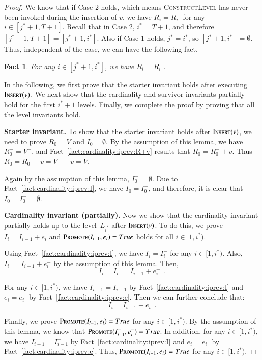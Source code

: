 \documentclass[11pt]{article}
\newtheorem{fact}[theorem]{Fact}
\newcommand{\constLevel}{\textsc{ConstructLevel}}
\newcommand{\replacementTester}{\textsc{Promote}}
\newcommand{\insertv}{{\textsc{Insert}}}
\begin{document}
\begin{proof}
We know that if Case 2 holds, which means \constLevel{} has never been invoked during the insertion of $v$, we have $R_i = R_i^-$  for any $i \in [j^* + 1, T + 1]$. Recall that in Case 2, $i^* = T + 1$, and therefore $[j^*+1, T+1] = [j^*+1, i^*]$. Also if Case 1 holds, $j^* = i^*$, so $[j^* + 1, i^*] = \emptyset$. Thus, independent of the case, we can have the following fact.

\begin{fact}
\label{fact:cardinality:iprev:R}
 For any $i \in [j^*+1, i^*]$, we have $R_i = R_i^-$.
\end{fact}

In the following, we first prove that the starter invariant holds after executing $\insertv(v)$. We next show that the cardinality and survivor invariants partially hold for the first $i^*+1$ levels. Finally, we complete the proof by proving that all the level invariants hold.

\textbf{Starter invariant.}
To show that the starter invariant holds after $\insertv(v)$, we need to prove $R_0= V$ and $I_0=\emptyset$.
By the assumption of this lemma, we have $R_0^-=V^-$, and Fact~\ref{fact:cardinality:iprev:R+v} results that $R_0 = R_0^- + v$. Thus $R_0 = R_0^- + v = V^- + v = V$.

Again by the assumption of this lemma, $I_0^-=\emptyset$.
Due to Fact~\ref{fact:cardinality:iprev:I}, we have $I_0=I^-_0$, and therefore, it is clear that $I_0 = I_0^- = \emptyset$.

\textbf{Cardinality invariant (partially).}
Now we show that the cardinality invariant partially holds up to the level~$L_{i^*}$ after $\insertv(v)$.
To do this, we prove $I_i = I_{i - 1} + e_i$ and $\replacementTester{}(I_{i - 1}, e_i)=True$ holds for all $i\in[1,i^*)$.

Using Fact~\ref{fact:cardinality:iprev:I}, we have $I_i = I_i^-$ for any $i\in  [1,i^*)$. Also, $I_i^- = I_{i - 1}^- + e_i^-$ by
the assumption of this lemma.  Then, 
$$ I_i = I_i^- = I_{i - 1}^- + e_i^- \enspace.
$$

For any $i\in[1,i^*)$, we have $I_{i - 1}=I_{i - 1}^-$ by Fact~\ref{fact:cardinality:iprev:I} and $e_i=e_i^-$ by Fact~\ref{fact:cardinality:iprev:e}. Then we can further conclude that:
$$
I_i = I_{i - 1} + e_i \enspace.
$$

Finally, we prove $\replacementTester{}(I_{i - 1}, e_i)=True$ for any $i\in[1,i^*)$. By the assumption of this lemma, we know that $\replacementTester{}(I_{i - 1}^-, e_i^-)=True$. In addition, for any $i\in[1,i^*)$, we have $I_{i - 1}=I_{i - 1}^-$ by Fact~\ref{fact:cardinality:iprev:I} and $e_i=e_i^-$ by Fact~\ref{fact:cardinality:iprev:e}. Thus, $\replacementTester{}(I_{i - 1}, e_i)=True$ for any $i\in[1,i^*)$.


\end{proof}
\end{document}
